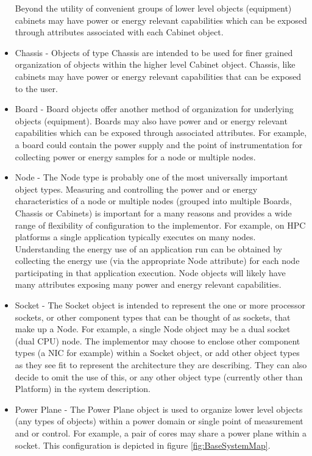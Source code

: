 \begin{itemize}[noitemsep,nolistsep]
{Beyond the utility of convenient groups of lower level objects (equipment) cabinets may have power or energy relevant capabilities which can be exposed through attributes associated with each Cabinet object. 
}
	\item{
Chassis - Objects of type Chassis are intended to be used for finer grained organization of objects within the higher level Cabinet object. Chassis, like cabinets may have power or energy relevant capabilities that can be exposed to the user.
}
	\item{
Board - Board objects offer another method of organization for underlying objects (equipment). 
Boards may also have power and or energy relevant capabilities which can be exposed through associated attributes. 
For example, a board could contain the power supply and the point of instrumentation for collecting power or energy samples for a node or multiple nodes.
}
	\item{
Node - The Node type is probably one of the most universally important object types. 
Measuring and controlling the power and or energy characteristics of a node or multiple nodes (grouped into multiple Boards, Chassis or Cabinets) is important for a many reasons and provides a wide range of flexibility of configuration to the implementor. 
For example, on HPC platforms a single application typically executes on many nodes. 
Understanding the energy use of an application run can be obtained by collecting the energy use (via the appropriate Node attribute) for each node participating in that application execution. 
Node objects will likely have many attributes exposing many power and energy relevant capabilities.
}
	\item{
Socket - The Socket object is intended to represent the one or more processor sockets, or other component types that can be thought of as sockets, that make up a Node. 
For example, a single Node object may be a dual socket (dual CPU) node.
The implementor may choose to enclose other component types (a NIC for example) within a Socket object, or add other object types as they see fit to represent the architecture they are describing.
They can also decide to omit the use of this, or any other object type (currently other than Platform) in the system description.
}
	\item{
Power Plane - The Power Plane object is used to organize lower level objects (any types of objects) within a power domain or single point of measurement and or control.
For example, a pair of cores may share a power plane within a socket. 
This configuration is depicted in figure \ref{fig:BaseSystemMap}. 
}
\end{itemize}
